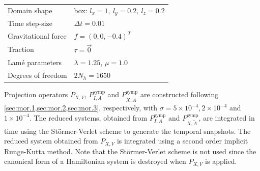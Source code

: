 \vspace{0.5cm}
\begin{center}
\begin{tabular}{|l|l|}
\hline
Domain shape & box: $l_x = 1,\ l_y = 0.2,\ l_z = 0.2$ \\
Time step-size & $\Delta t = 0.01$ \\
Gravitational force & $f = (0,0,-0.4)^T$ \\
Traction & $\tau = \vec 0$ \\
Lam\'e parameters & $\lambda = 1.25$, $\mu = 1.0$ \\
Degrees of freedom & $2N_{h} = 1650$ \\
\hline
\end{tabular}
\end{center}
\vspace{0.5cm}
Projection operators $P_{X,V}$, $P^{\text{symp}}_{I,A}$ and $P^{\text{symp}}_{X,\tilde A}$ are constructed following \cref{sec:mor.1,sec:mor.2,sec:mor.3}, respectively, with $\sigma = 5\times 10^{-4}, 2\times 10^{-4}$ and $1\times 10^{-4}$. The reduced systems, obtained from $P^{\text{symp}}_{I,A}$ and $P^{\text{symp}}_{X,\tilde A}$, are integrated in time using the St\"ormer-Verlet scheme to generate the temporal snapshots. The reduced system obtained from $P_{X,V}$ is integrated using a second order implicit Runge-Kutta method. Note that the St\"ormer-Verlet scheme is not used since the canonical form of a Hamiltonian system is destroyed when $P_{X,V}$ is applied.

